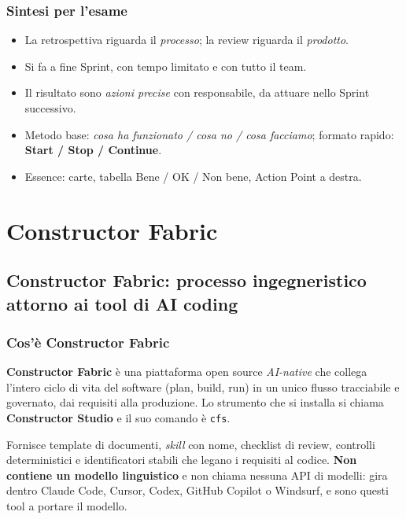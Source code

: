 \documentclass[a4paper,12pt]{article}
\begin{document}
\subsubsection{Sintesi per l'esame}
\begin{itemize}[nosep]
  \item La retrospettiva riguarda il \emph{processo}; la review riguarda il \emph{prodotto}.
  \item Si fa a fine Sprint, con tempo limitato e con tutto il team.
  \item Il risultato sono \emph{azioni precise} con responsabile, da attuare nello Sprint successivo.
  \item Metodo base: \emph{cosa ha funzionato / cosa no / cosa facciamo}; formato rapido:
        \textbf{Start / Stop / Continue}.
  \item Essence: carte, tabella Bene / OK / Non bene, Action Point a destra.
\end{itemize}


\section{Constructor Fabric}
\subsection{Constructor Fabric: processo ingegneristico attorno ai tool di AI coding}

\subsubsection{Cos'è Constructor Fabric}

\textbf{Constructor Fabric} è una piattaforma open source \emph{AI-native} che collega
l'intero ciclo di vita del software (plan, build, run) in un unico flusso tracciabile e
governato, dai requisiti alla produzione. Lo strumento che si installa si chiama
\textbf{Constructor Studio} e il suo comando è \texttt{cfs}.

Fornisce template di documenti, \emph{skill} con nome, checklist di review, controlli
deterministici e identificatori stabili che legano i requisiti al codice.
\textbf{Non contiene un modello linguistico} e non chiama nessuna API di modelli: gira
dentro Claude Code, Cursor, Codex, GitHub Copilot o Windsurf, e sono questi tool a
portare il modello.
\end{document}
